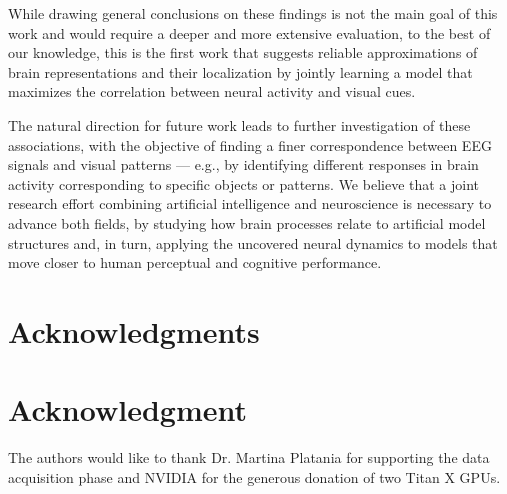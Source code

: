\documentclass[10pt,journal,compsoc,twocolumn]{IEEEtran}
\begin{document}
While drawing general conclusions on these findings is not the main goal of this work and would require a deeper and more extensive evaluation, to the best of our knowledge, this is the first work that suggests reliable approximations of brain representations and their localization by jointly learning a model that maximizes the correlation between neural activity and visual cues. 

The natural direction for future work leads to further investigation of these associations, with the objective of finding a finer correspondence between EEG signals and visual patterns --- e.g., by identifying different responses in brain activity corresponding to specific objects or patterns. We believe that a joint research effort combining artificial intelligence and neuroscience is necessary to advance both fields, by studying how brain processes relate to artificial model structures and, in turn, applying the uncovered neural dynamics to models that move closer to human perceptual and cognitive performance.



\ifCLASSOPTIONcompsoc
  \section*{Acknowledgments}
\else
  \section*{Acknowledgment}
\fi
The authors would like to thank Dr. Martina Platania for supporting the data acquisition phase and NVIDIA for the generous donation of two Titan X GPUs.

\ifCLASSOPTIONcaptionsoff
  \newpage
\fi




\end{document}
